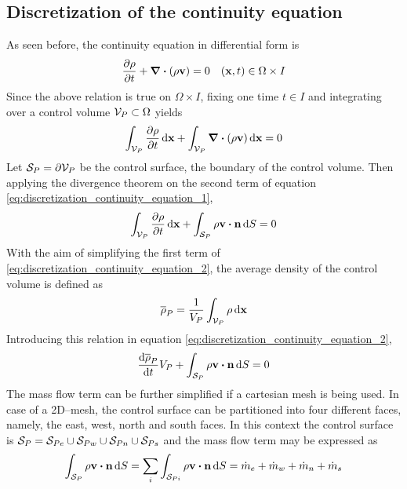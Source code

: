 
\subsection{Discretization of the continuity equation}

As seen before, the continuity equation in differential form is
\begin{equation}
	\pdv{\rho}{t} + \div(\rho \vb{v}) = 0 \quad (\vb{x},t) \in \Omega \times I
\end{equation}
Since the above relation is true on $\Omega \times I$, fixing one time $t \in I$ and integrating over a control volume $\mathcal{V}_{P} \subset \Omega$ yields
\begin{equation} \label{eq:discretization_continuity_equation_1}
	\int_{\mathcal{V}_{P}} \pdv{\rho}{t} \dd{\vb{x}} + \int_{\mathcal{V}_{P}} \div(\rho \vb{v}) \dd{\vb{x}} = 0
\end{equation}
Let $\mathcal{S}_{P} = \partial \mathcal{V}_{P}$ be the control surface, \ie the boundary of the control volume. Then applying the divergence theorem on the second term of equation \eqref{eq:discretization_continuity_equation_1},
\begin{equation} \label{eq:discretization_continuity_equation_2}
	\int_{\cv{P}} \pdv{\rho}{t} \dd{\vb{x}} + 
	\int_{\cs{P}} \rho \vb{v} \vdot \vb{n} \dd{S} = 0
\end{equation}
With the aim of simplifying the first term of \eqref{eq:discretization_continuity_equation_2}, the average density of the control volume is defined as
\begin{equation}
	\overline{\rho}_P = \frac{1}{V_P} \int_{\mathcal{V}_{P}} \rho \dd{\vb{x}}
\end{equation}
Introducing this relation in equation \eqref{eq:discretization_continuity_equation_2},
\begin{equation} \label{eq:discretization_continuity_equation_3}
	\frac{\dd \overline{\rho}_P}{\dd{t}} V_P + 
	\int_{\cs{P}} \rho \vb{v} \vdot \vb{n} \dd{S} = 0
\end{equation}
The mass flow term can be further simplified if a cartesian mesh is being used. In case of a 2D--mesh, the control surface can be partitioned into four different faces, namely, the east, west, north and south faces. In this context the control surface is $\mathcal{S}_{P} = \mathcal{S}_{Pe} \cup \mathcal{S}_{Pw} \cup \mathcal{S}_{Pn} \cup \mathcal{S}_{Ps}$ and the mass flow term may be expressed as
\begin{equation}
	\int_{\cs{P}} \rho \vb{v} \vdot \vb{n} \dd{S} = 
	\sum_{i} \int_{\cs{Pi}} \rho \vb{v} \vdot \vb{n} \dd{S} = 
	\dot{m}_e + \dot{m}_w + \dot{m}_n + \dot{m}_s
\end{equation}

